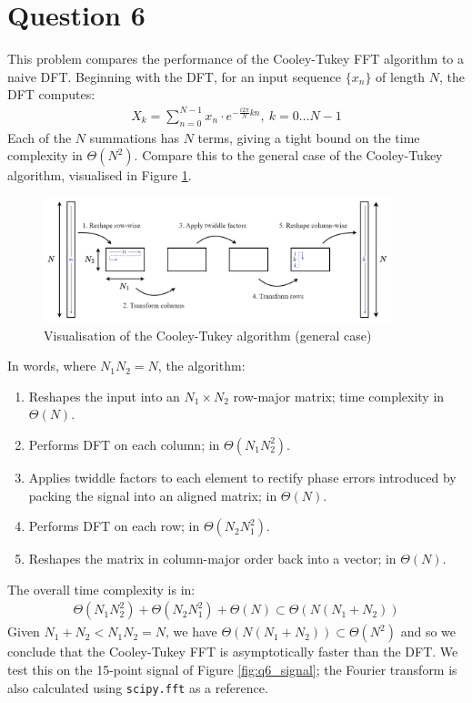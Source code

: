 \section*{Question 6}

This problem compares the performance of the Cooley-Tukey FFT algorithm to a naive DFT. Beginning with the DFT, for an input sequence $\{x_n\}$ of length $N$, the DFT computes:
\begin{align}
    X_k = \sum_{n=0}^{N-1} x_n \cdot e^{-\frac{i2\pi}{N}kn},\ k = 0 \ldots N - 1
\end{align}
Each of the $N$ summations has $N$ terms, giving a tight bound on the time complexity in $\Theta(N^2)$. Compare this to the general case of the Cooley-Tukey algorithm, visualised in Figure \ref{fig:viz_cooley_tukey}.

\begin{figure}[ht]
    \centering
    \includegraphics[width=0.9\textwidth]{images/q6_viz_cooley_tukey.png}
    \caption{Visualisation of the Cooley-Tukey algorithm (general case)}
    \label{fig:viz_cooley_tukey}
\end{figure}

In words, where $N_1N_2=N$, the algorithm:
\begin{enumerate}
    \item Reshapes the input into an $N_1\times N_2$ row-major matrix; time complexity in $\Theta(N)$.
    \item Performs DFT on each column; in $\Theta(N_1N_2^2)$.
    \item Applies twiddle factors to each element to rectify phase errors introduced by packing the signal into an aligned matrix; in $\Theta(N)$.
    \item Performs DFT on each row; in $\Theta(N_2N_1^2)$.
    \item Reshapes the matrix in column-major order back into a vector; in $\Theta(N)$.
\end{enumerate}
The overall time complexity is in:
\begin{align}
    \Theta(N_1N_2^2) + \Theta(N_2N_1^2) + \Theta(N) \subset \Theta(N(N_1+N_2))
\end{align}
Given $N_1+N_2<N_1N_2=N$, we have $\Theta(N(N_1+N_2))\subset \Theta(N^2)$ and so we conclude that the Cooley-Tukey FFT is asymptotically faster than the DFT. We test this on the 15-point signal of Figure \ref{fig:q6_signal}; the Fourier transform is also calculated using \texttt{scipy.fft} as a reference.

